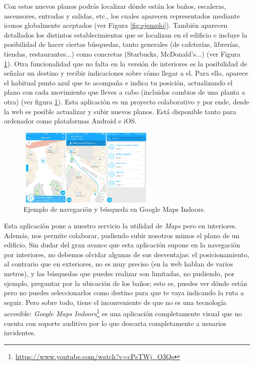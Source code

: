 Con estos nuevos planos podrás localizar dónde están los baños, escaleras, ascensores, entradas y salidas, etc., los cuales aparecen representados mediante iconos globalmente aceptados (ver Figura \ref{fig:ejemplo}). También aparecen detallados los distintos establecimientos que se localizan en el edificio e incluye la posibilidad de hacer ciertas búsquedas, tanto generales (de cafeterías, librerías, tiendas, restaurantes...) como concretas (Starbucks, McDonald's...) (ver Figura \ref{fig:ejemplo3}). Otra funcionalidad que no falta en la versión de interiores es la posibilidad de señalar un destino y recibir indicaciones sobre cómo llegar a el. Para ello, aparece el habitual punto azul que te acompaña e indica tu posición, actualizando el plano con cada movimiento que lleves a cabo (incluidos cambios de una planta a otra) (ver figura \ref{fig:ejemplo3}). Esta aplicación es un proyecto colaborativo y por ende, desde la web es posible actualizar y subir nuevos planos. Está disponible tanto para ordenador como plataformas Android e iOS.

\begin{figure}[t]
	\centering
	\includegraphics[width=0.6\textwidth]{Imagenes/Estadodelacuestion/GMapsInd}
	\caption{Ejemplo de navegación y búsqueda en Google Maps Indoors. }
	\label{fig:ejemplo3}
\end{figure}


Esta aplicación pone a nuestro servicio la utilidad de \textit{Maps} pero en interiores. Además, nos permite colaborar, pudiendo subir nosotros mimos el plano de un edificio. Sin dudar del gran avance que esta aplicación supone en la navegación por interiores, no debemos olvidar algunas de sus desventajas: el posicionamiento, al contrario que en exteriores, no es muy preciso (en la web hablan de varios metros), y las búsquedas que puedes realizar son limitadas, no pudiendo, por ejemplo, preguntar por la ubicación de los baños; esto es, puedes ver dónde están pero no puedes seleccionarlos como destino para que te vaya indicando la ruta a seguir. Pero sobre todo, tiene el inconveniente de que no es una tecnología accesible: \textit{Google Maps Indoors}\footnote{\url{https://www.youtube.com/watch?v=cPsTWj_O3Qs}} es una aplicación completamente visual que no cuenta con soporte auditivo por lo que descarta completamente a usuarios invidentes.



